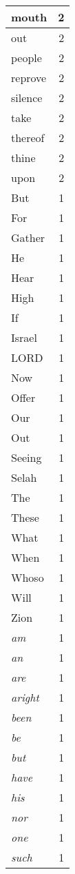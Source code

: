 \begin{center}
\begin{longtable}{l|r}
mouth & 2 \\ \hline
out & 2 \\ \hline
people & 2 \\ \hline
reprove & 2 \\ \hline
silence & 2 \\ \hline
take & 2 \\ \hline
thereof & 2 \\ \hline
thine & 2 \\ \hline
upon & 2 \\ \hline
But & 1 \\ \hline
For & 1 \\ \hline
Gather & 1 \\ \hline
He & 1 \\ \hline
Hear & 1 \\ \hline
High & 1 \\ \hline
If & 1 \\ \hline
Israel & 1 \\ \hline
LORD & 1 \\ \hline
Now & 1 \\ \hline
Offer & 1 \\ \hline
Our & 1 \\ \hline
Out & 1 \\ \hline
Seeing & 1 \\ \hline
Selah & 1 \\ \hline
The & 1 \\ \hline
These & 1 \\ \hline
What & 1 \\ \hline
When & 1 \\ \hline
Whoso & 1 \\ \hline
Will & 1 \\ \hline
Zion & 1 \\ \hline
\emph{am} & 1 \\ \hline
\emph{an} & 1 \\ \hline
\emph{are} & 1 \\ \hline
\emph{aright} & 1 \\ \hline
\emph{been} & 1 \\ \hline
\emph{be} & 1 \\ \hline
\emph{but} & 1 \\ \hline
\emph{have} & 1 \\ \hline
\emph{his} & 1 \\ \hline
\emph{nor} & 1 \\ \hline
\emph{one} & 1 \\ \hline
\emph{such} & 1 \\ \hline

\end{longtable}
\end{center}
